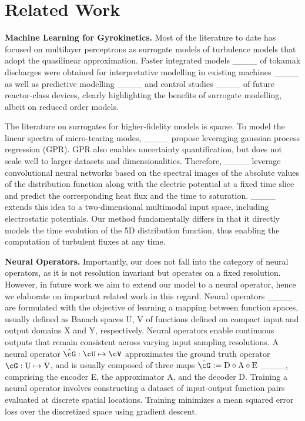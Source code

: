 \section{Related Work}
\textbf{Machine Learning for Gyrokinetics.}
Most of the literature to date has focused on multilayer perceptrons as surrogate models of turbulence models that adopt the quasilinear approximation. 
Faster integrated models ____  of tokamak discharges were obtained for interpretative modelling in existing machines ____ as well as predictive modelling ____ and control studies ____ of future reactor-class devices, clearly highlighting the benefits of surrogate modelling, albeit on reduced order models.

The literature on surrogates for higher-fidelity models is sparse. 
To model the linear spectra of micro-tearing modes, ____ propose leveraging gaussian process regression (GPR).
GPR also enables uncertainty quantification, but does not scale well to larger datasets and dimensionalities.
Therefore, ____ leverage convolutional neural networks based on the spectral images of the absolute values of the distribution function along with the electric potential at a fixed time slice and predict the corresponding heat flux and the time to saturation. 
____ extends this idea to a two-dimensional multimodal input space, including electrostatic potentials.
Our method fundamentally differs in that it directly models the time evolution of the 5D distribution function, thus enabling the computation of turbulent fluxes at any time. 

\textbf{Neural Operators.} 
Importantly, our \ourmethod{} does not fall into the category of neural operators, as it is not resolution invariant but operates on a fixed resolution.
However, in future work we aim to extend our model to a neural operator, hence we elaborate on important related work in this regard.
Neural operators ____ are formulated with the objective of learning a mapping between function spaces, usually defined as Banach spaces U, V of functions defined on compact input and output domains X and Y, respectively. 
Neural operators enable continuous outputs that remain consistent across varying input sampling resolutions. 
A neural operator $\hat{\cG} : \cU \mapsto \cV$ approximates the ground truth operator $\cG : \text{U} \mapsto \text{V}$, and is usually composed of three maps $\hat{\cG} := \text{D} \circ \text{A} \circ \text{E}$ ____, comprising the encoder E, the approximator A, and the decoder D. 
Training a neural operator involves constructing a dataset of input-output function pairs evaluated at discrete spatial locations. 
Training minimizes a mean squared error loss over the discretized space using gradient descent.

